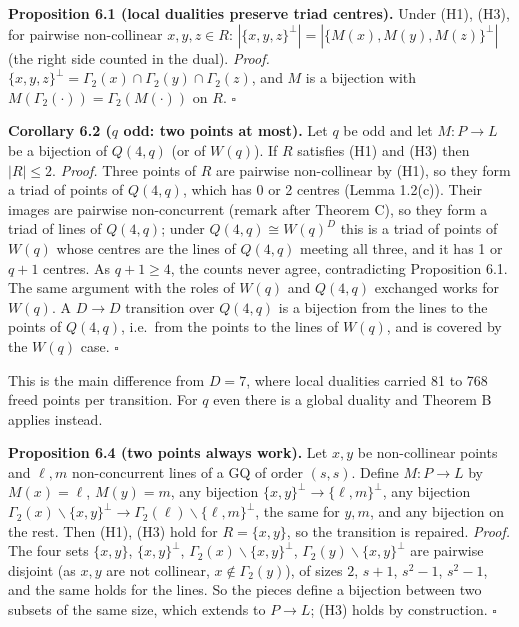 \documentclass[
  11pt,
]{article}
\begin{document}
\textbf{Proposition 6.1 (local dualities preserve triad centres).} Under
(H1), (H3), for pairwise non-collinear \(x,y,z\in R\):
\(|\{x,y,z\}^\perp| = |\{M(x),M(y),M(z)\}^\perp|\) (the right side
counted in the dual). \emph{Proof.}
\(\{x,y,z\}^\perp = \Gamma_2(x)\cap\Gamma_2(y)\cap\Gamma_2(z)\), and
\(M\) is a bijection with \(M(\Gamma_2(\cdot)) = \Gamma_2(M(\cdot))\) on
\(R\). \(\square\)

\textbf{Corollary 6.2 (\(q\) odd: two points at most).} Let \(q\) be odd
and let \(M: P\to L\) be a bijection of \(Q(4,q)\) (or of \(W(q)\)). If
\(R\) satisfies (H1) and (H3) then \(|R|\le 2\). \emph{Proof.} Three
points of \(R\) are pairwise non-collinear by (H1), so they form a triad
of points of \(Q(4,q)\), which has 0 or 2 centres (Lemma 1.2(c)). Their
images are pairwise non-concurrent (remark after Theorem C), so they
form a triad of lines of \(Q(4,q)\); under \(Q(4,q)\cong W(q)^D\) this
is a triad of points of \(W(q)\) whose centres are the lines of
\(Q(4,q)\) meeting all three, and it has 1 or \(q+1\) centres. As
\(q+1\ge 4\), the counts never agree, contradicting Proposition 6.1. The
same argument with the roles of \(W(q)\) and \(Q(4,q)\) exchanged works
for \(W(q)\). A \(D\to D\) transition over \(Q(4,q)\) is a bijection
from the lines to the points of \(Q(4,q)\), i.e.~from the points to the
lines of \(W(q)\), and is covered by the \(W(q)\) case. \(\square\)

This is the main difference from \(D = 7\), where local dualities
carried 81 to 768 freed points per transition. For \(q\) even there is a
global duality and Theorem B applies instead.

\textbf{Proposition 6.4 (two points always work).} Let \(x,y\) be
non-collinear points and \(\ell,m\) non-concurrent lines of a GQ of
order \((s,s)\). Define \(M: P\to L\) by \(M(x) = \ell\), \(M(y) = m\),
any bijection \(\{x,y\}^\perp\to\{\ell,m\}^\perp\), any bijection
\(\Gamma_2(x)\smallsetminus\{x,y\}^\perp\to\Gamma_2(\ell)\smallsetminus \{\ell,m\}^\perp\),
the same for \(y,m\), and any bijection on the rest. Then (H1), (H3)
hold for \(R = \{x,y\}\), so the transition is repaired. \emph{Proof.}
The four sets \(\{x,y\}\), \(\{x,y\}^\perp\),
\(\Gamma_2(x)\smallsetminus\{x,y\}^\perp\),
\(\Gamma_2(y)\smallsetminus \{x,y\}^\perp\) are pairwise disjoint (as
\(x,y\) are not collinear, \(x\notin\Gamma_2(y)\)), of sizes \(2\),
\(s+1\), \(s^2-1\), \(s^2-1\), and the same holds for the lines. So the
pieces define a bijection between two subsets of the same size, which
extends to \(P\to L\); (H3) holds by construction. \(\square\)
\end{document}
